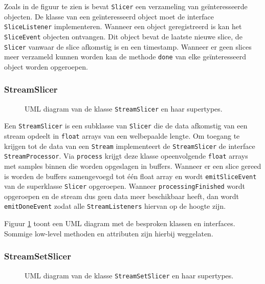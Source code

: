 Zoals in de figuur te zien is bevat \texttt{Slicer} een verzameling van geïnteresseerde objecten. De klasse van een geïnteresseerd object moet de interface \texttt{SliceListener} implementeren. Wanneer een object geregistreerd is kan het \texttt{SliceEvent} objecten ontvangen. Dit object bevat de laatste nieuwe slice, de \texttt{Slicer} vanwaar de slice afkomstig is en een timestamp. Wanneer er geen slices meer verzameld kunnen worden kan de methode \texttt{done} van elke geïnteresseerd object worden opgeroepen.

\subsubsection{StreamSlicer}

\begin{figure}[h!]
	\captionsetup{width=0.7\textwidth}
	\caption{UML diagram van de klasse \texttt{StreamSlicer} en haar supertypes.}
	\begin{center}
		\advance\parskip0.3cm
		
	\end{center}
	\label{streamSlicer}
\end{figure}

Een \texttt{StreamSlicer} is een subklasse van \texttt{Slicer} die de data afkomstig van een stream opdeelt in \texttt{float} arrays van een welbepaalde lengte. Om toegang te krijgen tot de data van een \texttt{Stream} implementeert de \texttt{StreamSlicer} de interface \texttt{StreamProcessor}. Via \texttt{process} krijgt deze klasse opeenvolgende \texttt{float} arrays met samples binnen die worden opgeslagen in buffers. Wanneer er een slice gereed is worden de buffers samengevoegd tot één float array en wordt \texttt{emitSliceEvent} van de superklasse \texttt{Slicer} opgeroepen. Wanneer \texttt{processingFinished} wordt opgeroepen en de stream dus geen data meer beschikbaar heeft, dan wordt \texttt{emitDoneEvent} zodat alle \texttt{StreamListeners} hiervan op de hoogte zijn.

Figuur \ref{streamSlicer} toont een UML diagram met de besproken klassen en interfaces. Sommige low-level methoden en attributen zijn hierbij weggelaten. 

\subsubsection{StreamSetSlicer}

\begin{figure}[h!]
	\captionsetup{width=0.7\textwidth}
	\caption{UML diagram van de klasse \texttt{StreamSetSlicer} en haar supertypes.}
	\begin{center}
		\advance\parskip0.3cm
		
	\end{center}
	\label{streamSetSlicer}
\end{figure}

